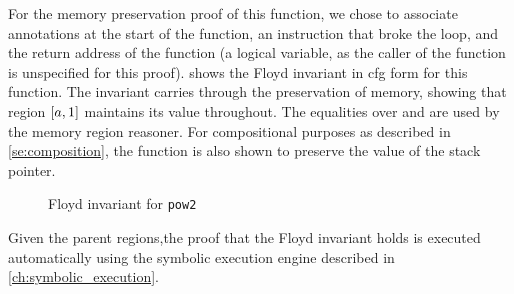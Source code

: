 For the memory preservation proof of this function, we chose to associate annotations
at the start of the function, an instruction that broke the loop,
and the return address of the function
(a logical variable, as the caller of the function is unspecified for this proof).
 shows the Floyd invariant in \ac{cfg} form for this function.
The invariant carries through the preservation of memory,
showing that region $[a,1]$ maintains its value throughout.
The equalities over  and 
are used by the memory region reasoner.
For compositional purposes as described in \cref{se:composition},
the function is also shown to preserve the value of the stack pointer.
\begin{figure}
  \centering
  \caption{Floyd invariant for \texttt{pow2}}
  \label{fig:pow2cfg}
\end{figure}
Given the parent regions,the proof that the Floyd invariant holds
is executed automatically using the symbolic execution engine
described in \cref{ch:symbolic_execution}.

